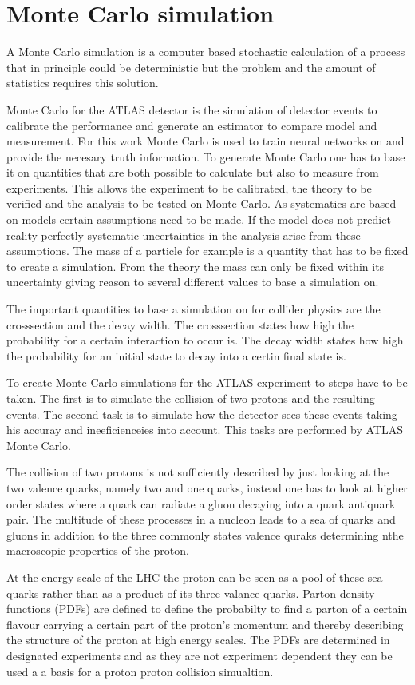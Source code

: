 \section{Monte Carlo simulation}

A Monte Carlo simulation is a computer based stochastic calculation of a process that in principle could be deterministic but the problem and the amount of statistics requires this solution.

Monte Carlo for the ATLAS detector is the simulation of detector events to calibrate the performance and generate an estimator to compare model and measurement. 
For this work Monte Carlo is used to train neural networks on and provide the necesary truth information.
To generate Monte Carlo one has to base it on quantities that are both possible to calculate but also to measure from experiments. This allows the experiment to be calibrated, the theory to be verified and the analysis to be tested on Monte Carlo.
As systematics are based on models certain assumptions need to be made. If the model does not predict reality perfectly systematic uncertainties in the analysis arise from these assumptions. The mass of a particle for example is a quantity that has to be fixed to create a simulation. From the theory the mass can only be fixed within its uncertainty giving reason to several different values to base a simulation on.

The  important quantities to base a simulation on for collider physics are the crosssection and the decay width. The crosssection states how high the probability for a certain interaction to occur is. The decay width states how high the probability for an initial state to decay into a certin final state is.

To create Monte Carlo simulations for the ATLAS experiment to steps have to be taken. The first is to simulate the collision of two protons and the resulting events. The second task is to simulate how the detector sees these events taking his accuray and ineeficienceies into account. This tasks are performed by ATLAS Monte Carlo.

The collision of two protons is not sufficiently described by just looking at the two valence quarks, namely two \Pup and one \Pdown quarks, instead one has to look at higher order states where a quark can radiate a gluon decaying into a quark antiquark pair. The multitude of these processes in a nucleon leads to a sea of quarks and gluons in addition to the three commonly states valence quraks determining nthe macroscopic properties of the proton.

At the energy scale of the LHC the proton can be seen as a pool of these sea quarks rather than as a product of its three valance quarks. Parton density functions (PDFs) are defined to define the probabilty to find a parton of a certain flavour carrying a certain part of the proton's momentum and thereby describing the structure of the proton at high energy scales. The PDFs are determined in designated experiments and as they are not experiment dependent they can be used a a basis for a proton proton collision simualtion.
